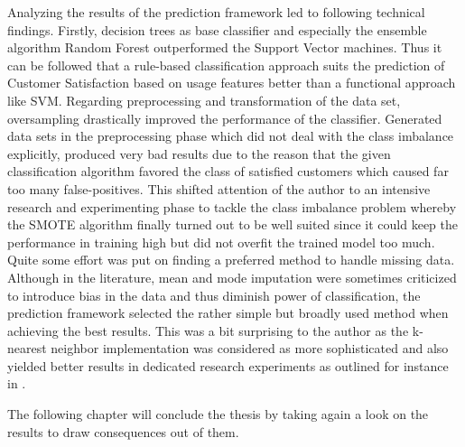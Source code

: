 Analyzing the results of the prediction framework led to following technical findings. Firstly, decision trees as base classifier and especially the ensemble algorithm Random Forest outperformed the Support Vector machines. Thus it can be followed that a rule-based classification approach suits the prediction of Customer Satisfaction based on usage features better than a functional approach like SVM. Regarding preprocessing and transformation of the data set, oversampling drastically improved the performance of the classifier. Generated data sets in the preprocessing phase which did not deal with the class imbalance explicitly, produced very bad results due to the reason that the given classification algorithm favored the class of satisfied customers which caused far too many false-positives. This shifted attention of the author to an intensive research and experimenting phase to tackle the class imbalance problem whereby the SMOTE algorithm finally turned out to be well suited since it could keep the performance in training high but did not overfit the trained model too much. Quite some effort was put on finding a preferred method to handle missing data. Although in the literature, mean and mode imputation were sometimes criticized to introduce bias in the data and thus diminish power of classification, the prediction framework selected the rather simple but broadly used method when achieving the best results. This was a bit surprising to the author as the k-nearest neighbor implementation was considered as more sophisticated and also yielded better results in dedicated research experiments as outlined for instance in \cite{batista2003analysis}.

The following chapter will conclude the thesis by taking again a look on the results to draw consequences out of them. 